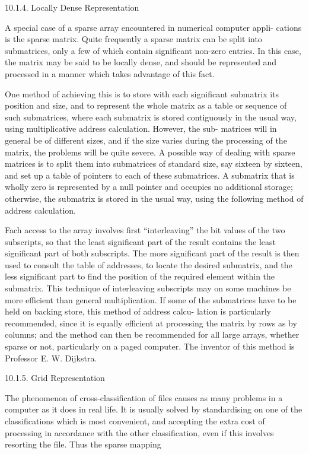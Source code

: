 {{		10.1.4. Locally Dense Representation
		
		A special case of a sparse array encountered in numerical computer appli- cations is the sparse matrix. Quite frequently a sparse matrix can be split into submatrices, only a few of which contain significant non-zero entries. In this case, the matrix may be said to be locally dense, and should be represented and processed in a manner which takes advantage of this fact.
		
		One method of achieving this is to store with each significant submatrix its position and size, and to represent the whole matrix as a table or sequence of such submatrices, where each submatrix is stored contiguously in the usual way, using multiplicative address calculation. However, the sub- matrices will in general be of different sizes, and if the size varies during the processing of the matrix, the problems will be quite severe. A possible way of dealing with sparse matrices is to split them into submatrices of standard size, say sixteen by sixteen, and set up a table of pointers to each of these submatrices. A submatrix that is wholly zero is represented by a null pointer and occupies no additional storage; otherwise, the submatrix is stored in the usual way, using the following method of address calculation.
		
		Fach access to the array involves first “interleaving” the bit values of the two subscripts, so that the least significant part of the result contains the least significant part of both subscripts. The more significant part of the result is then used to consult the table of addresses, to locate the desired submatrix, and the less significant part to find the position of the required element within the submatrix. This technique of interleaving subscripts may on some machines be more efficient than general multiplication. If some of the submatrices have to be held on backing store, this method of address calcu- lation is particularly recommended, since it is equally efficient at processing the matrix by rows as by columns; and the method can then be recommended for all large arrays, whether sparse or not, particularly on a paged computer. The inventor of this method is Professor E. W. Dijkstra.
		
		10.1.5. Grid Representation
		
		The phenomenon of cross-classification of files causes as many problems in a computer as it does in real life. It is usually solved by standardising on one of the classifications which is most convenient, and accepting the extra cost of processing in accordance with the other classification, even if this involves resorting the file. Thus the sparse mapping
		
}}
